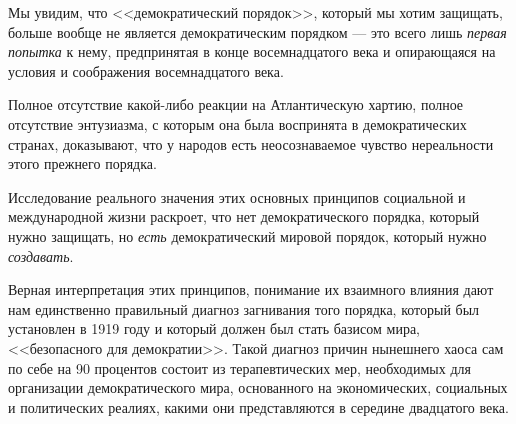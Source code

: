 Мы увидим, что <<демократический порядок>>, который мы хотим защищать, больше вообще не является демократическим порядком — это всего лишь \textit{первая попытка} к нему, предпринятая в конце восемнадцатого века и опирающаяся на условия и соображения восемнадцатого века.

Полное отсутствие какой-либо реакции на Атлантическую хартию, полное отсутствие энтузиазма, с которым она была воспринята в демократических странах, доказывают, что у народов есть неосознаваемое чувство нереальности этого прежнего порядка.

Исследование реального значения этих основных принципов социальной и международной жизни раскроет, что нет демократического порядка, который нужно защищать, но \textit{есть} демократический мировой порядок, который нужно \textit{создавать}.

Верная интерпретация этих принципов, понимание их взаимного влияния дают нам единственно правильный диагноз загнивания того порядка, который был установлен в 1919 году и который должен был стать базисом мира, <<безопасного для демократии>>. Такой диагноз причин нынешнего хаоса сам по себе на 90 процентов состоит из терапевтических мер, необходимых для организации демократического мира, основанного на экономических, социальных и политических реалиях, какими они представляются в середине двадцатого века.

